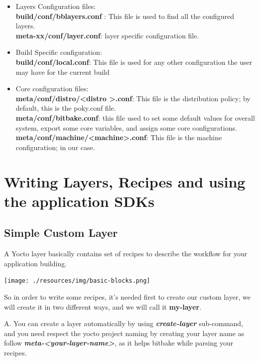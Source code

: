 \documentclass{article}
\begin{document}
\begin{itemize}
    \item Layers Configuration files:\\ \textbf{build/conf/bblayers.conf} : This file is used to find all the configured layers.\\
    \textbf{meta-xx/conf/layer.conf}: layer specific configuration file.
    \item Build Specific configuration:\\ \textbf{build/conf/local.conf}: This file is used for any other configuration the user may have for the current build
    \item Core configuration files: \\ \textbf{meta/conf/distro/\textless distro \textgreater .conf}: This file is the distribution policy; by default, this is the poky.conf file.\\
    \textbf{meta/conf/bitbake.conf}: this file used to set some default values for overall system, export some core variables, and assign some core configurations.\\
    \textbf{meta/conf/machine/\textless machine\textgreater .conf}: This file is the machine configuration; in our case.\\
\end{itemize}

\section{Writing Layers, Recipes and using the application SDKs}
\subsection{Simple Custom Layer}
\label{simple-custom-layers}
A Yocto layer basically contains set of recipes to describe the workflow for your application building.\\
\begin{center}
  \texttt{[image: ./resources/img/basic-blocks.png]}
\end{center}

So in order to write some recipes, it's needed first to create our custom layer, we will create it in two different ways, and we will call it \textbf{my-layer}.

A. You can create a layer automatically by using \textbf{\textit{create-layer}} sub-command, and you need respect the yocto project naming by creating your layer name as follow \textbf{\textit{meta-\textless your-layer-name\textgreater}}, as it helps bitbake while parsing your recipes.
  
\end{document}
